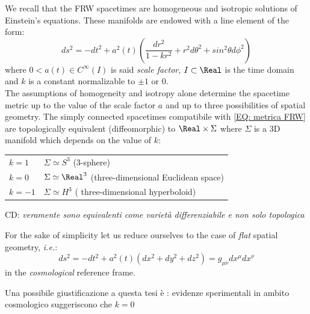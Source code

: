 \documentclass[Main]{subfiles}
\begin{document}
	We recall that the FRW spacetimes are homogeneous and isotropic solutions of Einstein's equations.
	These manifolds are endowed with a line element of the form:
	\begin{equation}\label{EQ: metrica FRW}
		ds^2 = -dt^2 + a^2(t) \left( \frac{dr^2}{1-k r^2} + r^2 d\theta^2 + sin^2\theta d\phi^2\right)
	\end{equation}
		where $0 < a(t) \in C^\infty	(I)$ is said \emph{scale factor}, $I \subset \Real$ is the time domain and $k$ is a constant normalizable to $\pm 1$ or $0$.\\
		The assumptions of homogeneity and isotropy alone determine the spacetime metric up to the value of the scale factor $a$ and up to three possibilities of spatial geometry.
		The simply connected spacetimes compatibile with \ref{EQ: metrica FRW} are topologically equivalent (diffeomorphic) 		
		to $\Real \times \Sigma$ where $\Sigma$ is a 3D manifold which depends on the value of $k$:
		\begin{center}\begin{tabular}{l l}
			$k = 1$ & $\Sigma \simeq S^3$ (3-sphere)\\
			$k = 0$ & $\Sigma \simeq \Real^3$ (three-dimensional Euclidean space)\\
			$k = -1$ & $\Sigma \simeq H^3$ ( three-dimensional hyperboloid)\\		
		\end{tabular}\end{center}
		\vspace{2mm}
\ifToninus
		\begin{Warning}
		CD:
		\emph{veramente sono equivalenti come varietà differenziabile e non solo topologica}
		\end{Warning}
\fi

		For the sake of simplicity let us reduce ourselves to the case of \emph{flat} spatial geometry, \textit{i.e.}:
		\begin{displaymath}
			ds^2 = -dt^2 + a^2(t) \left( dx^2 + dy^2 + dz^2\right) = g_{\mu \nu} dx^\mu dx^\nu
		\end{displaymath}
		in the \emph{cosmological} reference frame.
\ifToninus
	\begin{Warning}
		Una possibile giustificazione a questa tesi è : evidenze sperimentali in ambito cosmologico suggeriscono che $k=0$
	\end{Warning}
\fi
\end{document}
